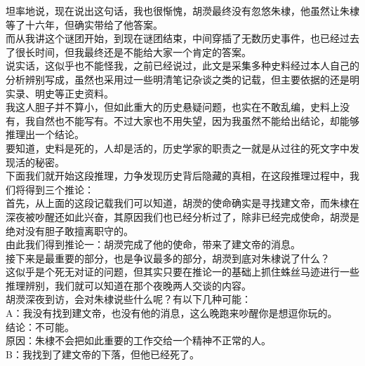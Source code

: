\begin{multicols}{\theparacolNo}
坦率地说，现在说出这句话，我也很惭愧，胡濙最终没有忽悠朱棣，他虽然让朱棣等了十六年，但确实带给了他答案。\\

而从我讲这个谜团开始，到现在谜团结束，中间穿插了无数历史事件，也已经过去了很长时间，但我最终还是不能给大家一个肯定的答案。\\

说实话，这似乎也不能怪我，之前已经说过，此文是采集多种史料经过本人自己的分析辨别写成，虽然也采用过一些明清笔记杂谈之类的记载，但主要依据的还是明实录、明史等正史资料。\\

我这人胆子并不算小，但如此重大的历史悬疑问题，也实在不敢乱编，史料上没有，我自然也不能写有。不过大家也不用失望，因为我虽然不能给出结论，却能够推理出一个结论。\\

要知道，史料是死的，人却是活的，历史学家的职责之一就是从过往的死文字中发现活的秘密。\\

下面我们就开始这段推理，力争发现历史背后隐藏的真相，在这段推理过程中，我们将得到三个推论：\\

首先，从上面的这段记载我们可以知道，胡濙的使命确实是寻找建文帝，而朱棣在深夜被吵醒还如此兴奋，其原因我们也已经分析过了，除非已经完成使命，胡濙是绝对没有胆子敢擅离职守的。\\

由此我们得到推论一：胡濙完成了他的使命，带来了建文帝的消息。\\

接下来是最重要的部分，也是争议最多的部分，胡濙到底对朱棣说了什么？\\

这似乎是个死无对证的问题，但其实只要在推论一的基础上抓住蛛丝马迹进行一些推理辨别，我们就可以知道在那个夜晚两人交谈的内容。\\

胡濙深夜到访，会对朱棣说些什么呢？有以下几种可能：\\

A：我没有找到建文帝，也没有他的消息，这么晚跑来吵醒你是想逗你玩的。\\

结论：不可能。\\

原因：朱棣不会把如此重要的工作交给一个精神不正常的人。\\

B：我找到了建文帝的下落，但他已经死了。\\


\end{multicols}
